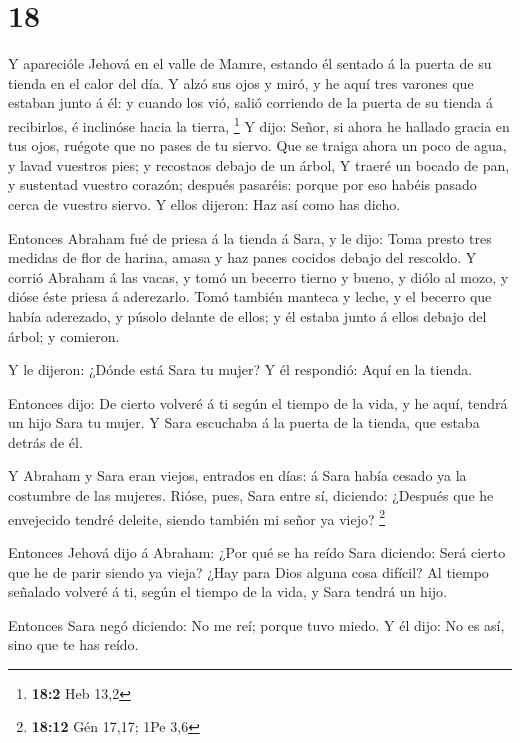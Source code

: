\hypertarget{section-17}{%
\section{18}\label{section-17}}

 Y aparecióle Jehová en el valle de Mamre, estando él
sentado á la puerta de su tienda en el calor del día.  Y
alzó sus ojos y miró, y he aquí tres varones que estaban junto á él: y
cuando los vió, salió corriendo de la puerta de su tienda á recibirlos,
é inclinóse hacia la tierra, \footnote{\textbf{18:2} Heb 13,2}
 Y dijo: Señor, si ahora he hallado gracia en tus ojos,
ruégote que no pases de tu siervo.  Que se traiga ahora un
poco de agua, y lavad vuestros pies; y recostaos debajo de un árbol,
 Y traeré un bocado de pan, y sustentad vuestro corazón;
después pasaréis: porque por eso habéis pasado cerca de vuestro siervo.
Y ellos dijeron: Haz así como has dicho.

 Entonces Abraham fué de priesa á la tienda á Sara, y le
dijo: Toma presto tres medidas de flor de harina, amasa y haz panes
cocidos debajo del rescoldo.  Y corrió Abraham á las
vacas, y tomó un becerro tierno y bueno, y diólo al mozo, y dióse éste
priesa á aderezarlo.  Tomó también manteca y leche, y el
becerro que había aderezado, y púsolo delante de ellos; y él estaba
junto á ellos debajo del árbol; y comieron.

 Y le dijeron: ¿Dónde está Sara tu mujer? Y él respondió:
Aquí en la tienda.

 Entonces dijo: De cierto volveré á ti según el tiempo de
la vida, y he aquí, tendrá un hijo Sara tu mujer. Y Sara escuchaba á la
puerta de la tienda, que estaba detrás de él.

 Y Abraham y Sara eran viejos, entrados en días: á Sara
había cesado ya la costumbre de las mujeres.  Rióse,
pues, Sara entre sí, diciendo: ¿Después que he envejecido tendré
deleite, siendo también mi señor ya viejo? \footnote{\textbf{18:12} Gén
  17,17; 1Pe 3,6}

 Entonces Jehová dijo á Abraham: ¿Por qué se ha reído
Sara diciendo: Será cierto que he de parir siendo ya vieja?
 ¿Hay para Dios alguna cosa difícil? Al tiempo señalado
volveré á ti, según el tiempo de la vida, y Sara tendrá un hijo.

 Entonces Sara negó diciendo: No me reí; porque tuvo
miedo. Y él dijo: No es así, sino que te has reído.

